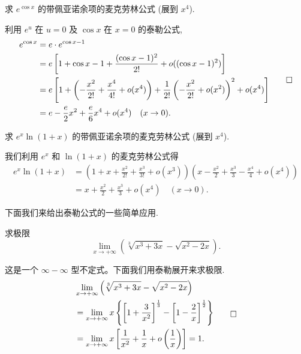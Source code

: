 \begin{example}\label{example:ma-5-3-9}
求 $e^{\cos x}$ 的带佩亚诺余项的麦克劳林公式 (展到 $x^4$).
\end{example}


\begin{solve}
利用 $e^u$ 在 $u=0$ 及 $\cos x$ 在 $x=0$ 的泰勒公式,
\[
\begin{aligned}
  e^{\cos x}
  &=
  e\cdot e^{\cos x-1} \\
  &=
  e\left[1+\cos x-1+\frac{(\cos x-1)^2}{2!}+o((\cos x-1)^2)\right] \\
  &=
  e\left[1+\left(-\frac{x^2}{2!}+\frac{x^4}{4!}+o(x^4)\right)
  +\frac1{2!}\left(-\frac{x^2}{2!}+o(x^2)\right)^2+o(x^4)\right] \\
  &=
  e-\frac e2x^2+\frac e6x^4+o(x^4)\quad (x\to0).
\end{aligned}
\qedhere
\]
\end{solve}


\begin{example}\label{example:ma-5-3-10}
求 $e^x\ln(1+x)$ 的带佩亚诺余项的麦克劳林公式 (展到 $x^4$).
\end{example}


\begin{solve}
我们利用 $e^x$ 和 $\ln(1+x)$ 的麦克劳林公式得
\[
\begin{aligned}
  e^x\ln(1+x)
  &=
  \left(1+x+\frac{x^2}{2!}+\frac{x^3}{3!}+o(x^3)\right)
  \left(x-\frac{x^2}{2}+\frac{x^3}{3}-\frac{x^4}{4}+o(x^4)\right) \\
  &=
  x+\frac{x^2}{2}+\frac{x^3}{3}+o(x^4)\quad (x\to0).
\end{aligned}
\]

下面我们来给出泰勒公式的一些简单应用.
\end{solve}


\begin{example}\label{example:ma-5-3-11}
求极限
\[
  \lim_{x\to+\infty}\left(\sqrt[3]{x^3+3x}-\sqrt{x^2-2x}\right).
\]
\end{example}


\begin{solve}
这是一个 $\infty-\infty$ 型不定式。下面我们用泰勒展开来求极限.
\[
\begin{aligned}
  &\lim_{x\to+\infty}\left(\sqrt[3]{x^3+3x}-\sqrt{x^2-2x}\right) \\
  &=
  \lim_{x\to+\infty}x
  \left\{
    \left[1+\frac3{x^2}\right]^{\frac13}
    -
    \left[1-\frac2x\right]^{\frac12}
  \right\} \\
  &=
  \lim_{x\to+\infty}x
  \left[
    \frac1{x^2}+\frac1x+o\left(\frac1x\right)
  \right]
  =
  1.
\end{aligned}
\qedhere
\]
\end{solve}


